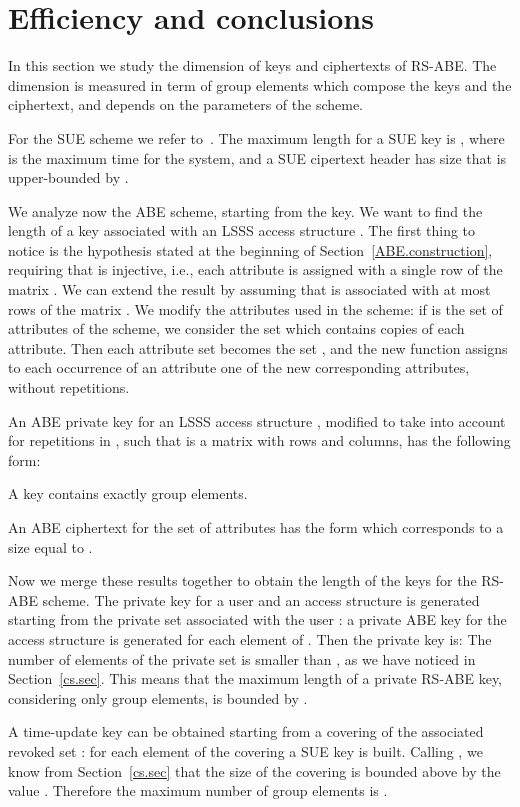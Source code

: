\documentclass[a4paper,10pt]{article}
\begin{document}
	\section{Efficiency and conclusions}
	\label{efficiency.sec}
	In this section we study the dimension of keys and ciphertexts of RS-ABE.
	The dimension is measured in term of group elements which compose the keys and the ciphertext, and depends on the parameters of the scheme.
	
	For the SUE scheme we refer to~\cite{lee2013RSABE}. The maximum length for a SUE key is , where  is the maximum time for the system, and a SUE cipertext header has size that is upper-bounded by .
	
	We analyze now the ABE scheme, starting from the key. We want to find the length of a key associated with an LSSS access structure . The first thing to notice is the hypothesis stated at the beginning of Section~\ref{ABE.construction}, requiring that  is injective, i.e., each attribute is assigned with a single row of the matrix . We can extend the result by assuming that  is associated with at most  rows of the matrix . We modify the attributes used in the scheme: if  is the set of attributes of the scheme, we consider the set  which contains  copies of each attribute. Then each attribute set  becomes the set , and the new function  assigns to each occurrence of an attribute one of the new corresponding attributes, without repetitions.
	
	An ABE private key for an LSSS access structure , modified to take into account for repetitions in , such that  is a matrix with  rows and  columns, has the following form:
	
	A key contains exactly  group elements.
	
	An ABE ciphertext for the set of attributes  has the form
	which corresponds to a size equal to .
	
	Now we merge these results together to obtain the length of the keys for the RS-ABE scheme.
	The private key for a user  and an access structure  is generated starting from the private set  associated with the user : a private ABE key for the access structure  is generated for each element of  . Then the private key is: 
	The number of elements  of the private set is smaller than , as we have noticed in Section~\ref{cs.sec}. This means that the maximum length of a private RS-ABE key, considering only group elements, is bounded by .
	
	A time-update key can be obtained starting from a covering of the associated revoked set : for each element of the covering  a SUE key is built. Calling , we know from Section~\ref{cs.sec} that the size of the covering is bounded above by the value . Therefore the maximum number of group elements is	.
	
\end{document}
